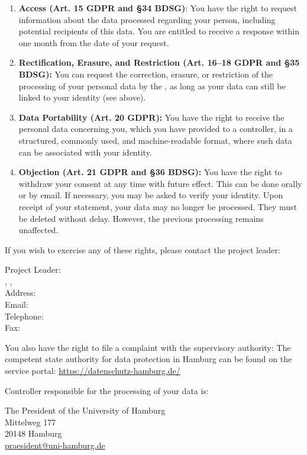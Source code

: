 \documentclass[11pt,twoside,a4paper]{article}
\begin{document}
\begin{enumerate}
  \item \textbf{Access (Art. 15 GDPR and §34 BDSG)}:
  You have the right to request information about the data processed regarding your person, including potential recipients of this data.
  You are entitled to receive a response within one month from the date of your request.
  \item \textbf{Rectification, Erasure, and Restriction (Art. 16--18 GDPR and §35 BDSG):}
  You can request the correction, erasure, or restriction of the processing of your personal data by the \ApplicantUniversity, as long as your data can still be linked to your identity (see above).
  \item \textbf{Data Portability (Art. 20 GDPR):}
  You have the right to receive the personal data concerning you, which you have provided to a controller, in a structured, commonly used, and machine-readable format, where such data can be associated with your identity.
  \item \textbf{Objection (Art. 21 GDPR and §36 BDSG):}
  You have the right to withdraw your consent at any time with future effect.
  This can be done orally or by email.
  If necessary, you may be asked to verify your identity.
  Upon receipt of your statement, your data may no longer be processed.
  They must be deleted without delay. However, the previous processing remains unaffected.
\end{enumerate}

If you wish to exercise any of these rights, please contact the project leader:

Project Leader: \ProjectLeaderName\\
\ProjectLeaderUniversity, \ProjectLeaderInstitute, \ProjectLeaderResearchGroup\\
Address: \ProjectLeaderAddress\\
Email: \ProjectLeaderEmailAddress\\
Telephone: \ProjectLeaderPhoneNumber\\
Fax: \ProjectLeaderFaxNumber{}

You also have the right to file a complaint with the supervisory authority:
The competent state authority for data protection in Hamburg can be found on the service portal: \url{https://datenschutz-hamburg.de/}

Controller responsible for the processing of your data is:

The President of the University of Hamburg\\
Mittelweg 177\\
20148 Hamburg\\
\href{mailto:praesident@uni-hamburg.de}{praesident@uni-hamburg.de}
\end{document}
